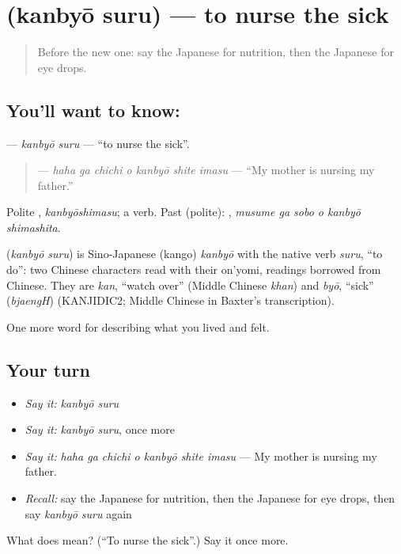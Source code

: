 \section[\texorpdfstring{\ja{かんびょうする} (kanbyō suru)}{かんびょうする (kanbyō suru)}]{ (kanbyō suru) — to nurse the sick}

\label{lesson:JA-C450-kanbyou-suru}



\begin{quote}
Before the new one: say the Japanese for nutrition, then the Japanese for eye drops.
\end{quote}

\subsection*{You'll want to know: }
\textbf{} — \emph{kanbyō suru} — \textquotedblleft{}to nurse the sick\textquotedblright{}.

\begin{quote}
\textbf{  } — \emph{haha ga chichi o kanbyō shite imasu} — \textquotedblleft{}My mother is nursing my father.\textquotedblright{}
\end{quote}

Polite \textbf{}, \emph{kanbyōshimasu}; a  verb. Past (polite): \textbf{  }, \emph{musume ga sobo o kanbyō shimashita}.

\begin{cousinweb}
\textbf{} (\emph{kanbyō suru}) is Sino-Japanese (kango) \emph{kanbyō} with the native verb \emph{suru}, \textquotedblleft{}to do\textquotedblright{}: two Chinese characters read with their on'yomi, readings borrowed from Chinese. They are \emph{kan}, \textquotedblleft{}watch over\textquotedblright{} (Middle Chinese \emph{khan}) and \emph{byō}, \textquotedblleft{}sick\textquotedblright{} (\emph{bjaengH}) (KANJIDIC2; Middle Chinese in Baxter's transcription).
\end{cousinweb}

\begin{grammarlens}[title={What you've built}]
One more word for describing what you lived and felt.
\end{grammarlens}

\subsection*{Your turn}
\begin{itemize}
\raggedright
  \item \emph{Say it:} \emph{kanbyō suru}
  \item \emph{Say it:} \emph{kanbyō suru}, once more
  \item \emph{Say it:} \emph{haha ga chichi o kanbyō shite imasu} — My mother is nursing my father.
  \item \emph{Recall:} say the Japanese for nutrition, then the Japanese for eye drops, then say \emph{kanbyō suru} again
\end{itemize}

\begin{tcolorbox}[breakable,colback=teal!4,colframe=teal!35!black,title={Before you move on}]
What does  mean? (\textquotedblleft{}To nurse the sick\textquotedblright{}.) Say it once more.
\end{tcolorbox}
